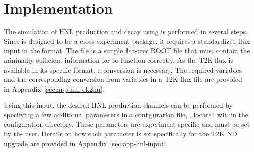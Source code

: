     \section{Implementation}
        The simulation of HNL production and decay using  is performed in several steps.
        Since  is designed to be a cross-experiment package, it requires a standardized flux input in the  format. 
        The  file is a simple flat-tree ROOT file that must contain the minimally sufficient information for  to function correctly.
        As the T2K flux is available in its specific format, a conversion is necessary. 
        The required  variables and the corresponding conversion from variables in a T2K flux file are provided in Appendix~\ref{sec:app-hnl-dk2nu}.

        Using this input, the desired HNL production channels can be performed by specifying a few additional parameters in a configuration  file, , located within the  configuration directory. 
        These parameters are experiment-specific and must be set by the user. Details on how each parameter is set specifically for the T2K ND upgrade are provided in Appendix~\ref{sec:app-hnl-input}. 

